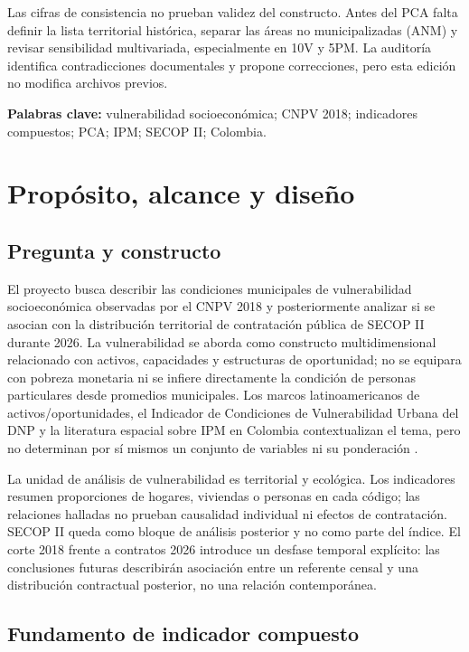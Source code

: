 \documentclass[11pt,a4paper]{article}
\begin{document}
Las cifras de consistencia no prueban validez del constructo. Antes del PCA falta definir la lista territorial histórica, separar las áreas no municipalizadas (ANM) y revisar sensibilidad multivariada, especialmente en 10V y 5PM. La auditoría identifica contradicciones documentales y propone correcciones, pero esta edición no modifica archivos previos.

\noindent\textbf{Palabras clave:} vulnerabilidad socioeconómica; CNPV 2018; indicadores compuestos; PCA; IPM; SECOP II; Colombia.
\clearpage
\tableofcontents
\clearpage
\listoftables
\clearpage
{}

\section{Propósito, alcance y diseño}

\subsection{Pregunta y constructo}

El proyecto busca describir las condiciones municipales de vulnerabilidad socioeconómica observadas por el CNPV 2018 y posteriormente analizar si se asocian con la distribución territorial de contratación pública de SECOP II durante 2026. La vulnerabilidad se aborda como constructo multidimensional relacionado con activos, capacidades y estructuras de oportunidad; no se equipara con pobreza monetaria ni se infiere directamente la condición de personas particulares desde promedios municipales. Los marcos latinoamericanos de activos/oportunidades, el Indicador de Condiciones de Vulnerabilidad Urbana del DNP y la literatura espacial sobre IPM en Colombia contextualizan el tema, pero no determinan por sí mismos un conjunto de variables ni su ponderación \citep{kaztman_filgueira_1999,pizarro_2001,dnp_icvu_2023,monsalvo_jimenez_2025}.

La unidad de análisis de vulnerabilidad es territorial y ecológica. Los indicadores resumen proporciones de hogares, viviendas o personas en cada código; las relaciones halladas no prueban causalidad individual ni efectos de contratación. SECOP II queda como bloque de análisis posterior y no como parte del índice. El corte 2018 frente a contratos 2026 introduce un desfase temporal explícito: las conclusiones futuras describirán asociación entre un referente censal y una distribución contractual posterior, no una relación contemporánea.

\subsection{Fundamento de indicador compuesto}
\end{document}
